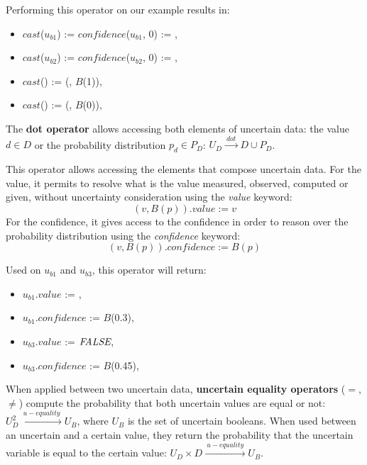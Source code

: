 Performing this operator on our example results in:
\begin{itemize}
    \item $cast$($u_{b1}$) := $confidence$($u_{b1}$, 0) := \false{},
    \item $cast$($u_{b2}$) := $confidence$($u_{b2}$, 0) := \true{},
    \item $cast$(\true{}) := (\true{}, $B$(1)),
    \item $cast$(\false{}) := (\false{}, $B$(0)),
\end{itemize}            			
		
\begin{operator}
    \label{op:dot}
    The \textbf{dot operator} allows accessing both elements of uncertain data: the value $d \in D$ or the probability distribution $p_d \in P_D$: $U_D \xrightarrow{~dot~} D \cup P_D$.
\end{operator}

This operator allows accessing the elements that compose uncertain data.
For the value, it permits to resolve what is the value measured, observed, computed or given, without uncertainty consideration using the \textit{value} keyword:
$$(v, B(p)).value := v$$
For the confidence, it gives access to the confidence in order to reason over the probability distribution using the \textit{confidence} keyword:
$$(v, B(p)).confidence := B(p)$$

Used on $u_{b1}$ and $u_{b3}$, this operator will return:
\begin{itemize}
    \item $u_{b1}$.$value$ := \true{},
    \item  $u_{b1}$.$confidence$ := $B$(0.3),
    \item $u_{b3}$.$value$ := $\textit{FALSE}{}$,
    \item $u_{b3}$.$confidence$ := $B$(0.45),
\end{itemize}

\begin{operator}
	\label{op:u-equality}
	When applied between two uncertain data, \textbf{uncertain equality operators} ($=$, $\neq$) compute the probability that both uncertain values are equal or not: $U_D^2 \xrightarrow{~u-equality~} U_B$, where $U_B$ is the set of uncertain booleans.
	When used between an uncertain and a certain value, they return the probability that the uncertain variable is equal to the certain value: $U_D \times D \xrightarrow{~u-equality~} U_B$.
\end{operator}

